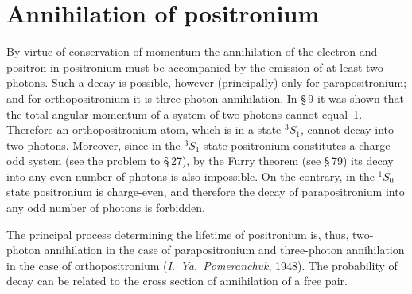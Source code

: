 
\section{Annihilation of positronium}


By virtue of conservation of momentum the annihilation of the electron and positron in positronium must be accompanied by the emission of at least two photons. Such a decay is possible, however (principally) only for parapositronium; and for orthopositronium it is three-photon annihilation. In \S\,9 it was shown that the total angular momentum of a system of two photons cannot equal~1. Therefore an orthopositronium atom, which is in a state ${}^3S_1$, cannot decay into two photons. Moreover, since in the ${}^3S_1$ state positronium constitutes a charge-odd system (see the problem to \S\,27), by the Furry theorem (see \S\,79) its decay into any even number of photons is also impossible. On the contrary, in the ${}^1S_0$ state positronium is charge-even, and therefore the decay of parapositronium into any odd number of photons is forbidden.

The principal process determining the lifetime of positronium is, thus, two-photon annihilation in the case of parapositronium and three-photon annihilation in the case of orthopositronium (\emph{I.~Ya.~Pomeranchuk}, 1948). The probability of decay can be related to the cross section of annihilation of a free pair.


